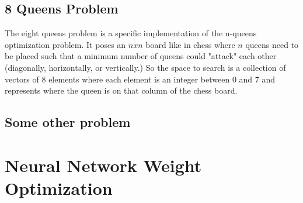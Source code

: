 \documentclass[11pt]{article}
\newcommand{\problemtwo}{8 Queens Problem}
\newcommand{\problemthree}{Some other problem}
\begin{document}
    \subsection{\problemtwo}
    The eight queens problem is a specific implementation of the n-queens optimization problem.\cite{Russel10} It poses
    an $n x n$ board like in chess where $n$ queens need to be placed such that a minimum number of queens could "attack"
    each other (diagonally, horizontally, or vertically.) So the space to search is a collection of vectors of 8 elements
    where each element is an integer between 0 and 7 and represents where the queen is on that column of the chess board.
    \linebreak

    \subsection{\problemthree}


    \section{Neural Network Weight Optimization}
    
    
\end{document}
